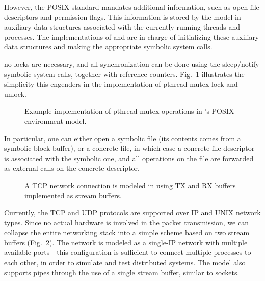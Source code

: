   However, the POSIX standard mandates additional information, such as open file descriptors and permission flags. This information is stored by the model in auxiliary data structures associated with the currently running threads and processes. The implementations of  and  are in charge of initializing these auxiliary data structures and making the appropriate symbolic system calls.

  no locks are necessary, and all synchronization can be done using the sleep/notify symbolic system calls, together with reference counters.  Fig.~\ref{fig:mutexcode} illustrates the simplicity this engenders in the implementation of pthread mutex lock and unlock.

\begin{figure}[h!]
  \centering
  \caption{Example implementation of pthread mutex operations in \cnine's POSIX environment model.}
  \label{fig:mutexcode}
\end{figure}

  In particular, one can either open a symbolic file (its contents comes from a symbolic block buffer), or a concrete file, in which case a concrete file descriptor is associated with the symbolic one, and all operations on the file are forwarded as external calls on the concrete descriptor. 

\begin{figure}[h!]
  \centering
  \caption{A TCP network connection is modeled in \cnine using TX and RX buffers implemented as stream buffers.}
  \label{fig:networkmodel}
\end{figure}

  Currently, the TCP and UDP protocols are supported over IP and UNIX network types. Since no actual hardware is involved in the packet transmission, we can collapse the entire networking stack into a simple scheme based on two stream buffers (Fig.~\ref{fig:networkmodel}). The network is modeled as a single-IP network with multiple available ports---this configuration is sufficient to connect multiple processes to each other, in order to simulate and test distributed systems. The model also supports pipes through the use of a single stream buffer, similar to sockets.

